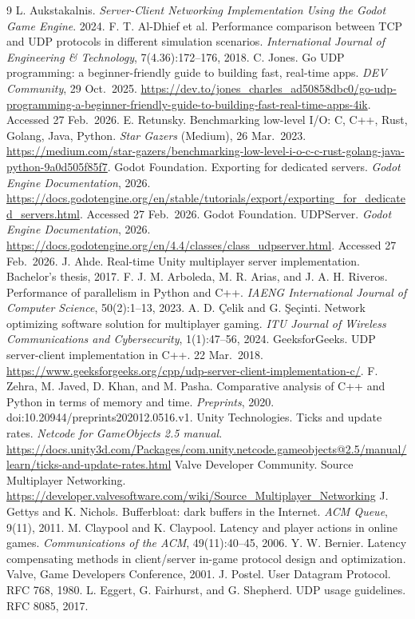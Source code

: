 \begin{thebibliography}{9}
 L. Aukstakalnis. \emph{Server-Client Networking Implementation Using the Godot Game Engine}. 2024.
 F. T. Al-Dhief et al. Performance comparison between TCP and UDP protocols in different simulation
scenarios. \emph{International Journal of Engineering \& Technology}, 7(4.36):172--176, 2018.
 C. Jones. Go UDP programming: a beginner-friendly guide to building fast, real-time apps. \emph{DEV Community}, 29 Oct.\ 2025. \url{https://dev.to/jones_charles_ad50858dbc0/go-udp-programming-a-beginner-friendly-guide-to-building-fast-real-time-apps-4ik}. Accessed 27 Feb.\ 2026.
 E. Retunsky. Benchmarking low-level I/O: C, C++, Rust, Golang, Java, Python. \emph{Star Gazers} (Medium), 26 Mar.\ 2023. \url{https://medium.com/star-gazers/benchmarking-low-level-i-o-c-c-rust-golang-java-python-9a0d505f85f7}.
 Godot Foundation. Exporting for dedicated servers. \emph{Godot Engine Documentation}, 2026. \url{https://docs.godotengine.org/en/stable/tutorials/export/exporting_for_dedicated_servers.html}. Accessed 27 Feb.\ 2026.
 Godot Foundation. UDPServer. \emph{Godot Engine Documentation}, 2026. \url{https://docs.godotengine.org/en/4.4/classes/class_udpserver.html}. Accessed 27 Feb.\ 2026.
 J. Ahde. Real-time Unity multiplayer server implementation. Bachelor's thesis, 2017.
 F. J. M. Arboleda, M. R. Arias, and J. A. H. Riveros. Performance of parallelism in Python and C++. \emph{IAENG International Journal of Computer Science}, 50(2):1--13, 2023.
 A. D. \c{C}elik and G. \c{S}eçinti. Network optimizing software solution for multiplayer gaming. \emph{ITU Journal of Wireless Communications and Cybersecurity}, 1(1):47--56, 2024.
 GeeksforGeeks. UDP server-client implementation in C++. 22 Mar.\ 2018. \url{https://www.geeksforgeeks.org/cpp/udp-server-client-implementation-c/}.
 F. Zehra, M. Javed, D. Khan, and M. Pasha. Comparative analysis of C++ and Python in terms of memory and time. \emph{Preprints}, 2020. doi:10.20944/preprints202012.0516.v1.
 Unity Technologies. Ticks and update rates. \emph{Netcode for GameObjects 2.5 manual}.
\url{https://docs.unity3d.com/Packages/com.unity.netcode.gameobjects@2.5/manual/learn/ticks-and-update-rates.html}
 Valve Developer Community. Source Multiplayer Networking.
\url{https://developer.valvesoftware.com/wiki/Source_Multiplayer_Networking}
 J. Gettys and K. Nichols. Bufferbloat: dark buffers in the Internet. \emph{ACM Queue}, 9(11), 2011.
 M. Claypool and K. Claypool. Latency and player actions in online games. \emph{Communications of the ACM}, 49(11):40--45, 2006.
 Y. W. Bernier. Latency compensating methods in client/server in-game protocol design and optimization. Valve, Game Developers Conference, 2001.
 J. Postel. User Datagram Protocol. RFC 768, 1980.
 L. Eggert, G. Fairhurst, and G. Shepherd. UDP usage guidelines. RFC 8085, 2017.
\end{thebibliography}


